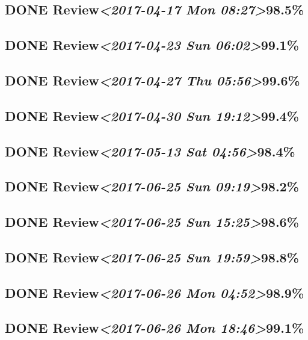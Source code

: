\documentclass[11pt]{ctexart}
\begin{document}
\subsection{{\bfseries\sffamily DONE} Review\textit{<2017-04-17 Mon 08:27>}98.5\%}
\label{sec:org14eac90}
\subsection{{\bfseries\sffamily DONE} Review\textit{<2017-04-23 Sun 06:02>}99.1\%}
\label{sec:orgdfba2be}
\subsection{{\bfseries\sffamily DONE} Review\textit{<2017-04-27 Thu 05:56>}99.6\%}
\label{sec:org3665645}
\subsection{{\bfseries\sffamily DONE} Review\textit{<2017-04-30 Sun 19:12>}99.4\%}
\label{sec:orgac722dc}
\subsection{{\bfseries\sffamily DONE} Review\textit{<2017-05-13 Sat 04:56>}98.4\%}
\label{sec:org77cd950}
\subsection{{\bfseries\sffamily DONE} Review\textit{<2017-06-25 Sun 09:19>}98.2\%}
\label{sec:orgc5b6e47}
\subsection{{\bfseries\sffamily DONE} Review\textit{<2017-06-25 Sun 15:25>}98.6\%}
\label{sec:org272c457}
\subsection{{\bfseries\sffamily DONE} Review\textit{<2017-06-25 Sun 19:59>}98.8\%}
\label{sec:org6dcb74e}
\subsection{{\bfseries\sffamily DONE} Review\textit{<2017-06-26 Mon 04:52>}98.9\%}
\label{sec:orgeb715fb}
\subsection{{\bfseries\sffamily DONE} Review\textit{<2017-06-26 Mon 18:46>}99.1\%}
\label{sec:org5f19071}
\end{document}
